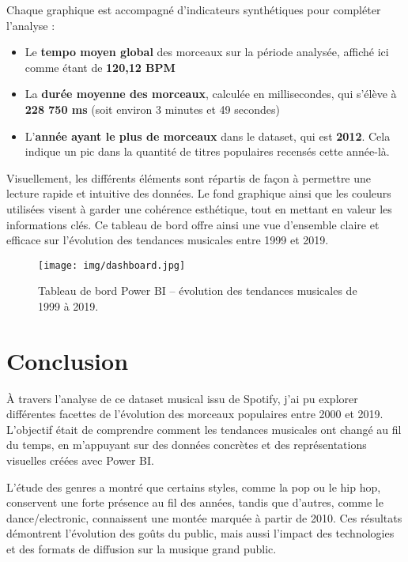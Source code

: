 \documentclass[french]{article}
\newcommand{\newLine}{\vspace{0.2cm}}
\begin{document}
\newLine

Chaque graphique est accompagné d'indicateurs synthétiques pour compléter l'analyse :
\begin{itemize}
    \item Le \textbf{tempo moyen global} des morceaux sur la période analysée, affiché ici comme étant de \textbf{120,12 BPM}
    \item La \textbf{durée moyenne des morceaux}, calculée en millisecondes, qui s'élève à \textbf{228 750 ms} (soit environ 3 minutes et 49 secondes)
    \item L'\textbf{année ayant le plus de morceaux} dans le dataset, qui est \textbf{2012}. Cela indique un pic dans la quantité de titres populaires recensés cette année-là.
\end{itemize}

\newLine

Visuellement, les différents éléments sont répartis de façon à permettre une lecture rapide et intuitive des données. Le fond graphique ainsi que les couleurs utilisées visent à garder une cohérence esthétique, tout en mettant en valeur les informations clés. Ce tableau de bord offre ainsi une vue d'ensemble claire et efficace sur l'évolution des tendances musicales entre 1999 et 2019.

\begin{figure}[h]
	\centering
	\texttt{[image: img/dashboard.jpg]}
	\caption{Tableau de bord Power BI – évolution des tendances musicales de 1999 à 2019.}
	\label{fig:dashboard}
\end{figure}







\clearpage
\section{Conclusion}

À travers l'analyse de ce dataset musical issu de Spotify, j'ai pu explorer différentes facettes de l'évolution des morceaux populaires entre 2000 et 2019. L'objectif était de comprendre comment les tendances musicales ont changé au fil du temps, en m'appuyant sur des données concrètes et des représentations visuelles créées avec Power BI.

\newLine

L'étude des genres a montré que certains styles, comme la pop ou le hip hop, conservent une forte présence au fil des années, tandis que d'autres, comme le dance/electronic, connaissent une montée marquée à partir de 2010. Ces résultats démontrent l'évolution des goûts du public, mais aussi l'impact des technologies et des formats de diffusion sur la musique grand public.
\end{document}
